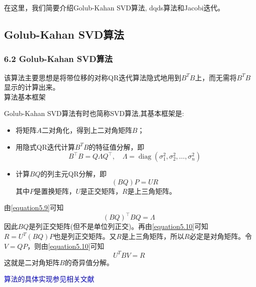 \documentclass[notheorems,serif]{beamer}
\begin{document}
\begin{frame}
在这里，我们简要介绍Golub-Kahan SVD算法, dqds算法和Jacobi迭代。

\end{frame}

\subsection*{Golub-Kahan SVD算法}
\begin{frame}
\frametitle{6.2 \qquad Golub-Kahan SVD算法}

该算法主要思想是将带位移的对称QR迭代算法隐式地用到$B^TB$上，而无需将$B^TB$显示的计算出来。\\
算法基本框架

Golub-Kahan SVD算法有时也简称SVD算法,其基本框架是:
\begin{itemize}
	\item 将矩阵$A$二对角化，得到上二对角矩阵$B$；
	\item 用隐式QR迭代计算$B^TB$的特征值分解，即
	\begin{equation}
	B^{\top} B=Q \Lambda Q^{\top}, \quad \Lambda=\operatorname{diag}\left(\sigma_{1}^{2}, \sigma_{2}^{2}, \ldots, \sigma_{n}^{2}\right)
	\label{equation5.9}
	\end{equation}
	\item 计算$BQ$的列主元QR分解，即\begin{equation}
	(B Q) P=U R
	\label{equation5.10}
	\end{equation}
	其中$P$是置换矩阵，$U$是正交矩阵，$R$是上三角矩阵。
\end{itemize}
\end{frame}
\begin{frame}
由\ref{equation5.9}可知$$
(B Q)^{\top} B Q=\Lambda
$$
因此$BQ$是列正交矩阵(但不是单位列正交)。再由\ref{equation5.10}可知$R=U^T(BQ)P$也是列正交矩阵。又$R$是上三角矩阵，所以$R$必定是对角矩阵。令$V=QP$，则由\ref{equation5.10}可知$$U^TBV=R$$这就是二对角矩阵$B$的奇异值分解。

\textcolor{blue}{算法的具体实现参见相关文献}
\end{frame}
\end{document}
